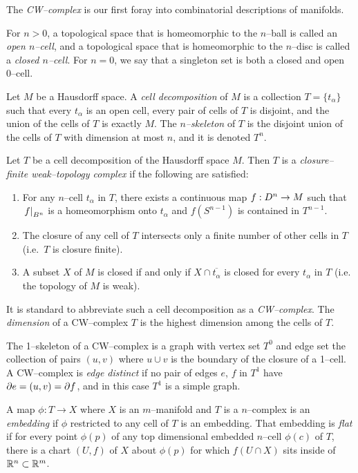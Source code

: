 The \emph{CW--complex} is our first foray into combinatorial descriptions of manifolds.

\begin{defn}
	For $n>0$, a topological space that is homeomorphic to the $n$--ball is called an \emph{open $n$--cell}, and a topological space that is homeomorphic to the $n$--disc is called a \emph{closed $n$--cell}.
	For $n=0$, we say that a singleton set is both a closed and open 0--cell.
	
	Let $M$ be a Hausdorff space.
	A \emph{cell decomposition} of $M$ is a collection $T=\{t_\alpha\}$ such that every $t_\alpha$ is an open cell, every pair of cells of $T$ is disjoint, and the union of the cells of $T$ is exactly $M$.
	The \emph{$n$--skeleton} of $T$ is the disjoint union of the cells of $T$ with dimension at most $n$, and it is denoted $T^n$.
	
	Let $T$ be a cell decomposition of the Hausdorff space $M$.
	Then $T$ is a \emph{closure--finite weak--topology complex} if the following are satisfied: 
	\begin{enumerate}
		\item For any $n$--cell $t_\alpha$ in $T$, there exists a continuous map $f:D^n\to M$ such that $\left.f\right|_{B^n}$ is a homeomorphism onto $t_\alpha$ and $f(S^{n-1})$ is contained in $T^{n-1}$.
		\item The closure of any cell of $T$ intersects only a finite number of other cells in $T$ (i.e.\ $T$ is closure finite).
		\item A subset $X$ of $M$ is closed if and only if $X\cap \overline{t_\alpha}$ is closed for every $t_\alpha$ in $T$ (i.e. the topology of $M$ is weak).		
	\end{enumerate}
	It is standard to abbreviate such a cell decomposition as a \emph{CW--complex}.	
	The \emph{dimension} of a CW--complex $T$ is the highest dimension among the cells of $T$.
	
	The 1--skeleton of a CW--complex is a graph with vertex set $T^0$ and edge set the collection of pairs $(u,v)$ where $u\cup v$ is the boundary of the closure of a 1--cell.
	A CW--complex is \emph{edge distinct} if no pair of edges $e$, $f$ in $T^1$ have $\partial e=(u,v)=\partial f$, and in this case $T^1$ is a simple graph.
	
	A map $\phi:T\to X$ where $X$ is an $m$--manifold and $T$ is a $n$--complex is an \emph{embedding} if $\phi$ restricted to any cell of $T$ is an embedding.
	That embedding is \emph{flat} if for every point $\phi(p)$ of any top dimensional embedded $n$--cell $\phi(c)$ of $T$, there is a chart $(U,f)$ of $X$ about $\phi(p)$ for which $f(U\cap X)$ sits inside of $\mathbb{R}^n\subset \mathbb{R}^m$.
\end{defn}

